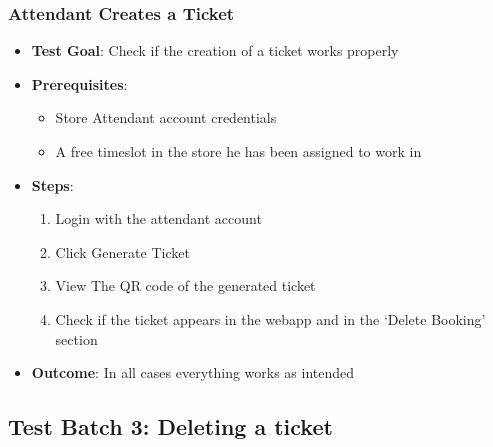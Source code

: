 \subsubsection{Attendant Creates a Ticket}
\begin{itemize}
    \item \textbf{Test Goal}: Check if the creation of a ticket works properly
    \item \textbf{Prerequisites}:
          \begin{itemize}
              \item Store Attendant account credentials
              \item A free timeslot in the store he has been assigned to work in
          \end{itemize}
    \item \textbf{Steps}:
          \begin{enumerate}
              \item Login with the attendant account
              \item Click Generate Ticket
              \item View The QR code of the generated ticket
              \item Check if the ticket appears in the webapp and in the `Delete Booking' section
          \end{enumerate}
    \item \textbf{Outcome}: In all cases everything works as intended
\end{itemize}


\subsection{Test Batch 3: Deleting a ticket}
